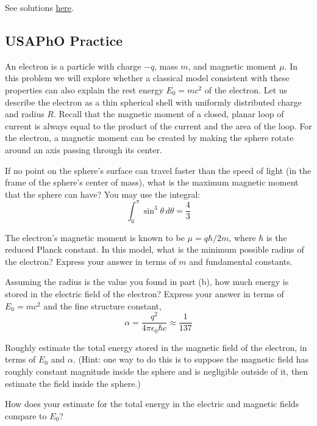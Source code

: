 \documentclass[11pt]{scrartcl}
\begin{document}
\begin{sol}
See solutions \href{https://s3.eu-central-1.amazonaws.com/physprob.com/files/ipho/2000_UnitedKingdom_p2Sol.pdf}{here}.
\end{sol}

\subsection{USAPhO Practice}

\begin{prob}[USAPhO 2021 A3]
    An electron is a particle with charge $-q$, mass $m$, and magnetic moment $\mu$. In this problem we will explore whether a classical model consistent with these properties can also explain the rest energy $E_0 = mc^2$ of the electron. Let us describe the electron as a thin spherical shell with uniformly distributed charge and radius $R$. Recall that the magnetic moment of a closed, planar loop of current is always equal to the product of the current and the area of the loop. For the electron, a magnetic moment can be created by making the sphere rotate around an axis passing through its center.
    \begin{anum}
        \item If no point on the sphere’s surface can travel faster than the speed of light (in the frame of the sphere’s center of mass), what is the maximum magnetic moment that the sphere can have? You may use the integral:
        $$\int_0^\pi\sin^3\theta\, d\theta=\frac43$$
        \item The electron’s magnetic moment is known to be $\mu = q\hbar/2m$, where $\hbar$ is the reduced Planck constant. In this model, what is the minimum possible radius of the electron? Express your answer in terms of $m$ and fundamental constants.
        \item Assuming the radius is the value you found in part (b), how much energy is stored in the electric field of the electron? Express your answer in terms of $E_0 = mc^2$ and the fine structure constant, $$\alpha=\frac{q^2}{4\pi\epsilon_0\hbar c}\approx \frac1{137}$$
        \item Roughly estimate the total energy stored in the magnetic field of the electron, in terms of $E_0$ and $\alpha$. (Hint: one way to do this is to suppose the magnetic field has roughly constant magnitude inside the sphere and is negligible outside of it, then estimate the field inside the sphere.)
        \item How does your estimate for the total energy in the electric and magnetic fields compare to $E_0$?
    \end{anum}
\end{prob}
\end{document}
